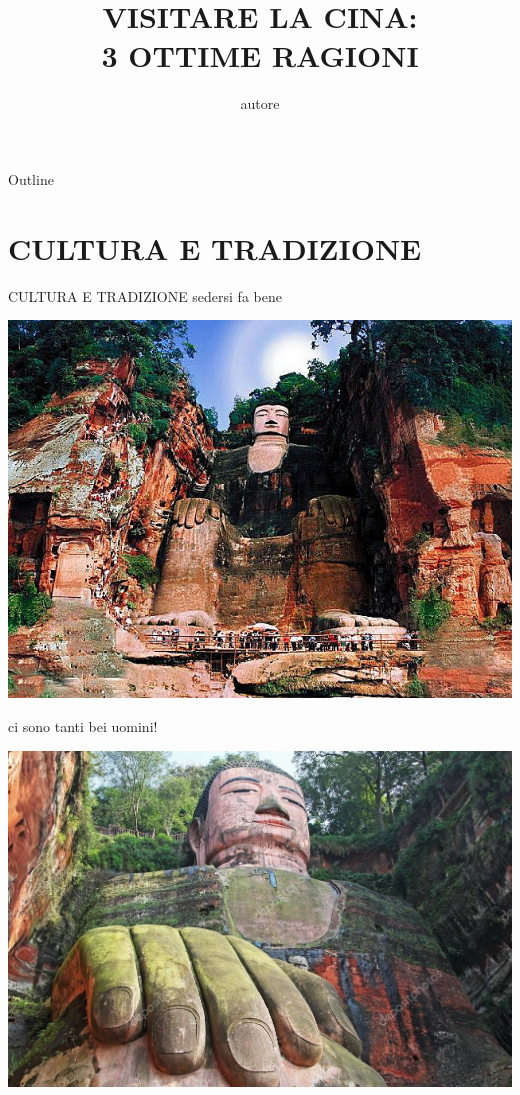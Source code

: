 \documentclass[presentation]{beamer}
\author{autore}
\date{}
\title{VISITARE LA CINA: \\ 3 OTTIME RAGIONI}
\begin{document}
\maketitle
\begin{frame}{Outline}
\tableofcontents
\end{frame}


\section{CULTURA E TRADIZIONE}
\label{sec:org05ac415}
\begin{frame}[label={sec:org98f57d3}]{CULTURA E TRADIZIONE}
sedersi fa bene
\begin{center}
\includegraphics[width=.9\linewidth]{./immagini/uomo_seduto.jpg}
\end{center}
\end{frame}
\begin{frame}[label={sec:org9005a21}]{ci sono tanti bei uomini!}
\begin{center}
\includegraphics[width=.9\linewidth]{./immagini/faccia_uomo.jpg}
\end{center}
\end{frame}
\end{document}
